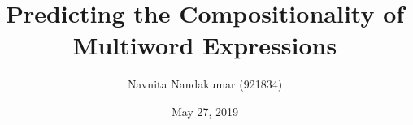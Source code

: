 \documentclass{beamer}
\title[Compositionality Prediction]{Predicting the Compositionality of Multiword Expressions} %
\author{Navnita Nandakumar (921834)} %
\institute[] %
{
Department of Computing and Information Systems \\
The University of Melbourne \\
\medskip
Credit Points: 75\\
COMP90070 - Research Project \\
\bigskip
\small{
\textit{Supervised by} \\
Prof. Timothy Baldwin \\ Dr. Bahar Salehi
}}
\date{May 27, 2019} %
\begin{document}
\begin{frame}
\titlepage %
\end{frame}




\end{document}
